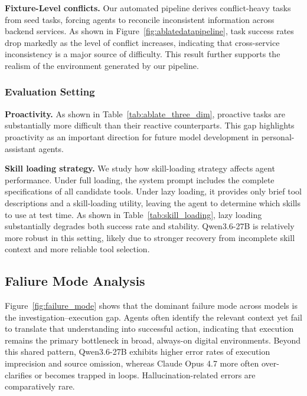 \documentclass{article}
\begin{document}
\textbf{Fixture-Level conflicts.} Our automated pipeline derives conflict-heavy tasks from seed tasks, forcing agents to reconcile inconsistent information across backend services. As shown in Figure~\ref{fig:ablatedatapipeline}, task success rates drop markedly as the level of conflict increases, indicating that cross-service inconsistency is a major source of difficulty. This result further supports the realism of the environment generated by our pipeline.


\subsubsection{Evaluation Setting}
\label{sec:ab_eval_setting}
\textbf{Proactivity.} As shown in Table~\ref{tab:ablate_three_dim}, proactive tasks are substantially more difficult than their reactive counterparts. This gap highlights proactivity as an important direction for future model development in personal-assistant agents. 

\textbf{Skill loading strategy.} We study how skill-loading strategy affects agent performance. Under full loading, the system prompt includes the complete specifications of all candidate tools. Under lazy loading, it provides only brief tool descriptions and a skill-loading utility, leaving the agent to determine which skills to use at test time. As shown in Table~\ref{tab:skill_loading}, lazy loading substantially degrades both success rate and stability. Qwen3.6-27B is relatively more robust in this setting, likely due to stronger recovery from incomplete skill context and more reliable tool selection.

\subsection{Faliure Mode Analysis}
Figure~\ref{fig:failure_mode} shows that the dominant failure mode across models is the investigation--execution gap. Agents often identify the relevant context yet fail to translate that understanding into successful action, indicating that execution remains the primary bottleneck in broad, always-on digital environments. Beyond this shared pattern, Qwen3.6-27B exhibits higher error rates of execution imprecision and source omission, whereas Claude Opus 4.7 more often over-clarifies or becomes trapped in loops. Hallucination-related errors are comparatively rare. 
\end{document}

